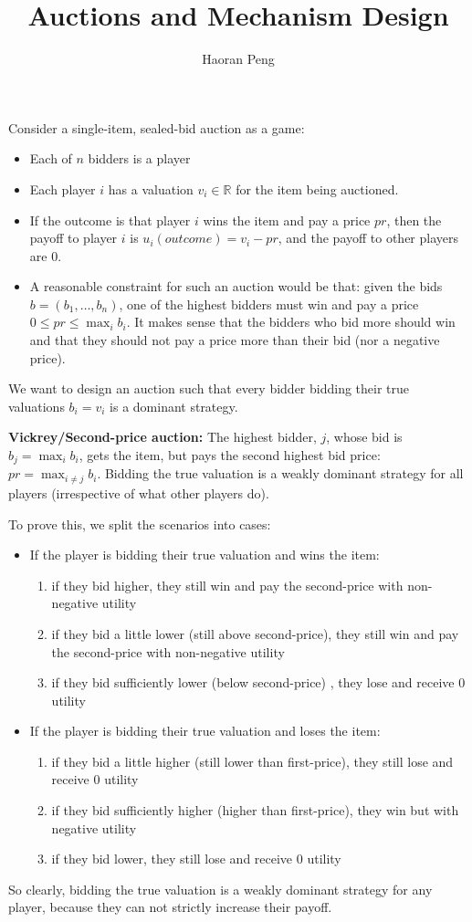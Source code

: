 \documentclass{article}
\begin{document}
	\title{Auctions and Mechanism Design}
	\author{Haoran Peng}
	\maketitle
Consider a single-item, sealed-bid auction as a game:
\begin{itemize}
\item Each of $n$ bidders is a player
\item Each player $i$ has a valuation $v_i\in \mathbb{R}$ for the item being auctioned.
\item If the outcome is that player $i$ wins the item and pay a price $pr$, then the payoff to player $i$ is $u_i(outcome) = v_i  - pr$, and the payoff to other players are 0.
\item A reasonable constraint for such an auction would be that: given the bids $b = (b_1,\ldots,b_n)$, one of the highest bidders must win and pay a price $0 \le pr \le \max_i b_i$. It makes sense that the bidders who bid more should win and that they should not pay a price more than their bid (nor a negative price).
\end{itemize}

We want to design an auction such that every bidder bidding their true valuations $b_i = v_i$ is a dominant strategy.

\textbf{Vickrey/Second-price auction: } The highest bidder, $j$, whose bid is $b_j = \max_i b_i$, gets the item, but pays the second highest bid price: $pr = \max_{i\neq j} b_i$. Bidding the true valuation is a weakly dominant strategy for all players (irrespective of what other players do).

To prove this, we split the scenarios into cases:
\begin{itemize}
\item If the player is bidding their true valuation and wins the item:
\begin{enumerate}
 \item if they bid higher, they still win and pay the second-price with non-negative utility
 \item if they bid a little lower (still above second-price), they still win and pay the second-price with non-negative utility
 \item if they bid sufficiently lower (below second-price) , they lose and receive 0 utility
\end{enumerate}
\item If the player is bidding their true valuation and loses the item:
\begin{enumerate}
\item if they bid a little higher (still lower than first-price), they still lose and receive 0 utility
\item if they bid sufficiently higher (higher than first-price), they win but with negative utility
\item if they bid lower, they still lose and receive 0 utility
\end{enumerate}
\end{itemize}
So clearly, bidding the true valuation is a weakly dominant strategy for any player, because they can not strictly increase their payoff. 
\end{document}
